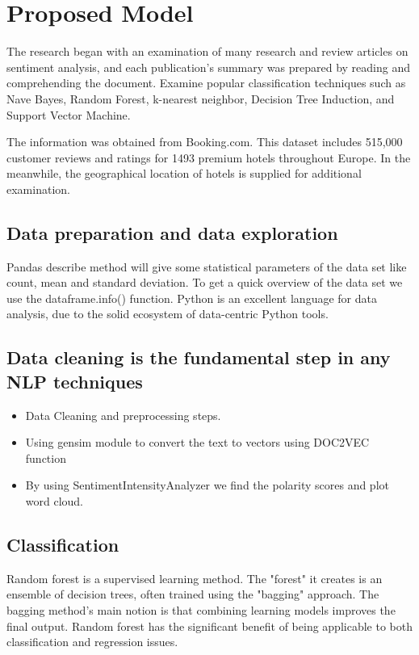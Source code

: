 \section{Proposed Model}
The research began with an examination of many research and review articles on sentiment analysis, and each publication's summary was prepared by reading and comprehending the document. Examine popular classification techniques such as Nave Bayes, Random Forest, k-nearest neighbor, Decision Tree Induction, and Support Vector Machine.

The information was obtained from Booking.com. This dataset includes 515,000 customer reviews and ratings for 1493 premium hotels throughout Europe. In the meanwhile, the geographical location of hotels is supplied for additional examination.


\subsection{Data preparation and data exploration}

Pandas describe method will give some statistical parameters of the data set like count, mean and standard deviation. To get a quick overview of the data set we use the dataframe.info() function. Python is an excellent language for data analysis, due to the solid ecosystem of data-centric Python tools.

\subsection{Data cleaning is the fundamental step in any NLP techniques}
\begin{itemize}

\item Data Cleaning and preprocessing steps.
\item Using gensim module to convert the text to vectors using DOC2VEC function 
\item By using SentimentIntensityAnalyzer we find the polarity scores and plot word cloud.
\end{itemize}

\subsection{ Classification}

Random forest is a supervised learning method. The "forest" it creates is an ensemble of decision trees, often trained using the "bagging" approach. The bagging method's main notion is that combining learning models improves the final output. Random forest has the significant benefit of being applicable to both classification and regression issues.

